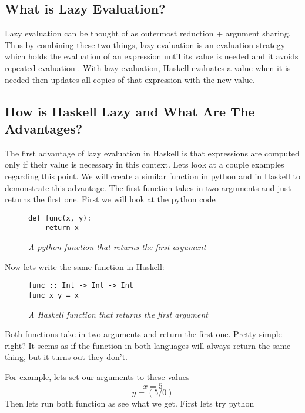 \documentclass{article}
\begin{document}
\subsection{What is Lazy Evaluation?}

\medskip\noindent
Lazy evaluation can be thought of as outermost reduction + argument sharing. Thus by combining these two things, lazy evaluation is an evaluation strategy which holds the evaluation of an expression until its value is needed and it avoids repeated evaluation \cite{TP}. With lazy evaluation, Haskell evaluates a value when it is needed then updates all copies of that expression with the new value. 


\subsection{How is Haskell Lazy and What Are The Advantages?}

\medskip\noindent
The first advantage of lazy evaluation in Haskell is that expressions are computed only if their value is  necessary in this context. Lets look at a couple examples regarding this point. We will create a similar function in python and in Haskell to demonstrate this advantage. The first function takes in two arguments and just returns the first one. First we will look at the python code
\begin{figure}[H]
    \begin{lstlisting}
def func(x, y):
    return x
    \end{lstlisting}
    \vspace{-1.5em}

    \caption{\textit{A python function that returns the first argument}}
\end{figure}

\medskip\noindent
Now lets write the same function in Haskell:

\begin{figure}[H]
    \begin{lstlisting}
func :: Int -> Int -> Int
func x y = x
    \end{lstlisting}
    \caption{\textit{A Haskell function that returns the first argument}}
\end{figure}

\medskip\noindent
Both functions take in two arguments and return the first one. Pretty simple right? It seems as if the function in both languages will always return the same thing, but it turns out they don't. 

\medskip\noindent
For example, lets set our arguments to these values $$x = 5$$ $$y = (5/0)$$ Then lets run both function as see what we get. First lets try python
\end{document}
